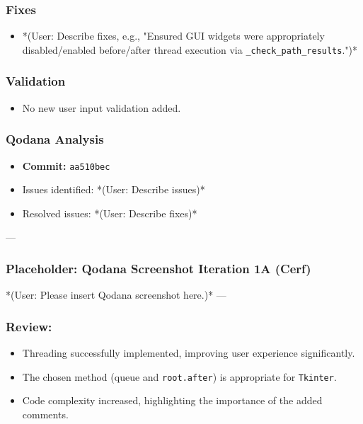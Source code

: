 \subsubsection{Fixes}
\begin{itemize}
	\item *(User: Describe fixes, e.g., "Ensured GUI widgets were appropriately disabled/enabled before/after thread execution via \verb|_check_path_results|.")*
\end{itemize}

\subsubsection{Validation}
\begin{itemize}
	\item No new user input validation added.
\end{itemize}

\subsubsection{Qodana Analysis}
\begin{itemize}
	\item \textbf{Commit:} \verb|aa510bec|
	\item Issues identified: *(User: Describe issues)*
	\item Resolved issues: *(User: Describe fixes)*
\end{itemize}

--- %
\subsubsection*{Placeholder: Qodana Screenshot Iteration 1A (Cerf)}
*(User: Please insert Qodana screenshot here.)*
---

\subsubsection{Review:}
\begin{itemize}
	\item Threading successfully implemented, improving user experience significantly.
	\item The chosen method (queue and \verb|root.after|) is appropriate for \verb|Tkinter|.
	\item Code complexity increased, highlighting the importance of the added comments.
\end{itemize}

